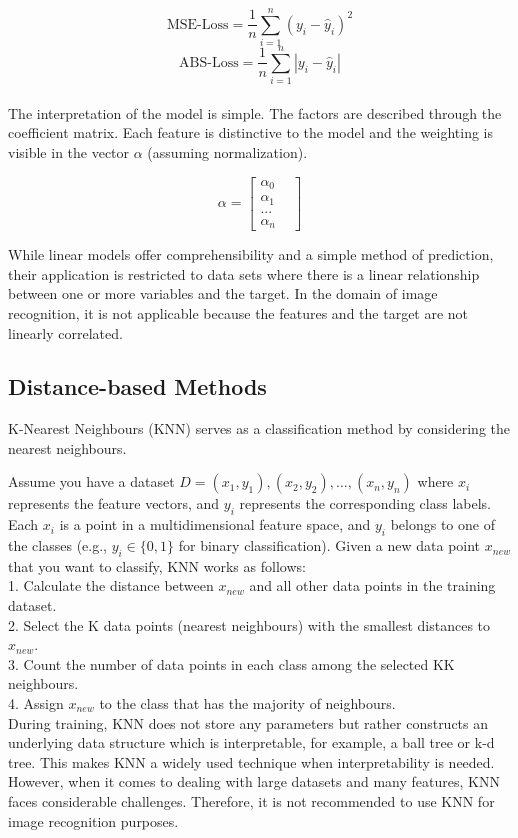 $$ \text{MSE-Loss} = \frac{1}{n} \sum_{i=1}^{n} (y_i - \hat{y}_i)^2$$
$$ \text{ABS-Loss} = \frac{1}{n} \sum_{i=1}^{n} |y_i - \hat{y}_i|$$
\\
The interpretation of the model is simple. The factors are described through the coefficient matrix. Each feature is distinctive to the model and the weighting is visible in the vector $\alpha$ (assuming normalization).

$$ \alpha = \begin{bmatrix}
	\alpha_0 & \\
	\alpha_1 & \\
	... & \\
	\alpha_n &
\end{bmatrix}
$$

While linear models offer comprehensibility and a simple method of prediction, their application is restricted to data sets where there is a linear relationship between one or more variables and the target. In the domain of image recognition, it is not applicable because the features and the target are not linearly correlated.

\subsection{Distance-based Methods}
\label{KNN}
K-Nearest Neighbours (KNN) \cite{Mucherino2009} serves as a classification method by considering the nearest neighbours. 


Assume you have a dataset $D={(x_1,y_1),(x_2,y_2),…,(x_n,y_n)}$ where $x_i$ represents the feature vectors, and $y_i$ represents the corresponding class labels. Each $x_i$ is a point in a multidimensional feature space, and $y_i$ belongs to one of the classes (e.g., $y_i \in \{0,1\}$ for binary classification). 
Given a new data point $x_{new}$ that you want to classify, KNN works as follows:\\

1. Calculate the distance between $x_{new}$ and all other data points in the training dataset.\\
2. Select the K data points (nearest neighbours) with the smallest distances to $x_{new}$.\\
3. Count the number of data points in each class among the selected KK neighbours.\\
4. Assign $x_{new}$ to the class that has the majority of neighbours.\\

During training, KNN does not store any parameters but rather constructs an underlying data structure which is interpretable, for example, a ball tree or k-d tree. This makes KNN a widely used technique when interpretability is needed. However, when it comes to dealing with large datasets and many features, KNN faces considerable challenges. Therefore, it is not recommended to use KNN for image recognition purposes.

